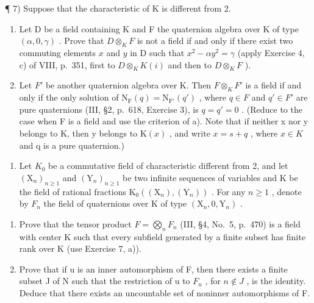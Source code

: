 ¶ 7) Suppose that the characteristic of K is different from 2.

\begin{enumerate}
\def\labelenumi{\alph{enumi})}
\item
  Let D be a field containing K and F the quaternion algebra over K of type \((\alpha, 0, \gamma)\) . Prove that \(D \otimes_{K} F\) is not a field if and only if there exist two commuting elements \(x\) and \(y\) in D such that \(x^2 - \alpha y^2 = \gamma\) (apply Exercise 4, c) of VIII, p.~351, first to \(D \otimes_{K} K(i)\) and then to \(D \otimes_{K} F\) ).
\item
  Let \(F'\) be another quaternion algebra over K. Then \(F \otimes_{K} F'\) is a field if and only if the only solution of \(\mathrm{N}_{\mathrm{F}}(q) = \mathrm{N}_{\mathrm{F}'}(q')\) , where \(q \in F\) and \(q' \in F'\) are pure quaternions (III, §2, p.~618, Exercise 3), is \(q = q' = 0\) . (Reduce to the case when F is a field and use the criterion of a). Note that if neither x nor y belongs to K, then y belongs to \(\mathrm{K}(x)\) , and write \(x = s + q\) , where \(x \in K\) and q is a pure quaternion.)
\end{enumerate}

\begin{enumerate}
\def\labelenumi{\arabic{enumi})}
\setcounter{enumi}{7}
\tightlist
\item
  Let \(K_{0}\) be a commutative field of characteristic different from 2, and let \((\mathrm{X}_{n})_{n\geqslant1}\) and \((\mathrm{Y}_{n})_{n\geqslant1}\) be two infinite sequences of variables and K be the field of rational fractions \(\mathrm{K}_{0}((\mathrm{X}_{n}),(\mathrm{Y}_{n}))\) . For any \(n\geqslant1\) , denote by \(F_{n}\) the field of quaternions over K of type \((\mathrm{X}_{n},0,\mathrm{Y}_{n})\) .
\end{enumerate}

\begin{enumerate}
\def\labelenumi{\alph{enumi})}
\item
  Prove that the tensor product \(F = \bigotimes_{n} F_{n}\) (III, §4, No.~5, p.~470) is a field with center K such that every subfield generated by a finite subset has finite rank over K (use Exercise 7, a)).
\item
  Prove that if u is an inner automorphism of F, then there exists a finite subset J of N such that the restriction of u to \(F_{n}\) , for \(n \notin J\) , is the identity. Deduce that there exists an uncountable set of noninner automorphisms of F.
\end{enumerate}

